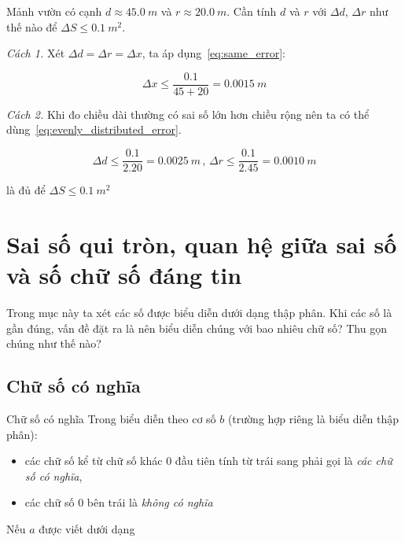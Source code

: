 \documentclass[../../Lectures.tex]{subfiles}
\begin{document}
\begin{exmp}
    Mảnh vườn có cạnh \(d \approx \qty{45.0}{m}\) và \(r \approx
    \qty{20.0}{m}\). Cần tính \(d\) và \(r\) với \(\Delta d\), \(\Delta r\) như
    thế nào để \(\Delta S \leq \qty{0.1}{m^2}\).

    \emph{Cách 1.}
    Xét \(\Delta d = \Delta r = \Delta x\), ta áp dụng~\ref{eq:same_error}:

    \[\Delta x \leq \frac{\num{0.1}}{45 + 20} = \qty{0.0015}{m}\]

    \emph{Cách 2.}
    Khi đo chiều dài thường có sai số lớn hơn chiều rộng nên ta có thể
    dùng~\ref{eq:evenly_distributed_error}.

    \[
        \Delta d \leq \frac{\num{0.1}}{\num{2.20}} = \qty{0.0025}{m} \, \text{, }
        \Delta r \leq \frac{\num{0.1}}{\num{2.45}} = \qty{0.0010}{m}
    \]

    là đủ để \(\Delta S \leq \qty{0.1}{m^2}\)
\end{exmp}

\section[Sai số quy tròn, quan hệ sai số \& số chữ số chắc]{Sai số qui tròn, quan hệ giữa sai số và số chữ số đáng tin}

Trong mục này ta xét các số được biểu diễn dưới dạng thập phân. Khi các số là
gần đúng, vấn đề đặt ra là nên biểu diễn chúng với bao nhiêu chữ số? Thu gọn
chúng như thế nào?

\subsection{Chữ số có nghĩa}

\begin{cdefinition}{Chữ số có nghĩa}{}
    Trong biểu diễn theo cơ số \(b\) (trường hợp riêng là biểu diễn thập phân):

    \begin{itemize}
        \item các chữ số kể từ chữ số khác \(0\) đầu tiên tính từ trái sang phải
            gọi là \emph{các chữ số có nghĩa},

        \item các chữ số \(0\) bên trái là \emph{không có nghĩa}
    \end{itemize}
\end{cdefinition}

Nếu \(a\) được viết dưới dạng
\end{document}
